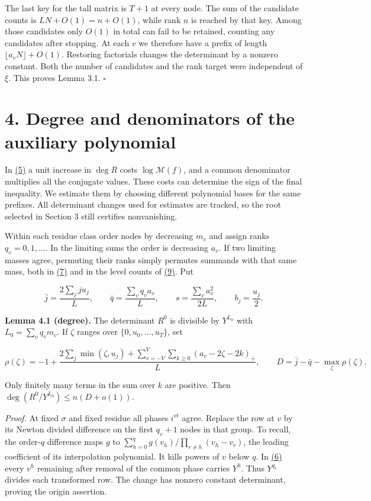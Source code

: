 \documentclass[11pt,a4paper]{article}
\begin{document}
The last key for the tall matrix is \(T+1\) at every node. The sum of the candidate counts is \(LN+O(1)=n+O(1)\), while rank \(n\) is reached by that key. Among those candidates only \(O(1)\) in total can fail to be retained, counting any candidates after stopping. At each \(v\) we therefore have a prefix of length \(\lfloor a_vN\rfloor+O(1)\). Restoring factorials changes the determinant by a nonzero constant. Both the number of candidates and the rank target were independent of \(\xi\). This proves Lemma 3.1. \(\square\)

\section{4. Degree and denominators of the auxiliary polynomial}\label{degree-and-denominators-of-the-auxiliary-polynomial}

In \hyperref[eq:5]{(5)} a unit increase in \(\deg R\) costs \(\log\mathcal M(f)\), and a common denominator multiplies all the conjugate values. These costs can determine the sign of the final inequality. We estimate them by choosing different polynomial bases for the same prefixes. All determinant changes used for estimates are tracked, so the root selected in Section 3 still certifies nonvanishing.

Within each residue class order nodes by decreasing \(m_v\) and assign ranks \(q_v=0,1,\ldots\). In the limiting sums the order is decreasing \(a_v\). If two limiting masses agree, permuting their ranks simply permutes summands with that same mass, both in \hyperref[eq:7]{(7)} and in the level counts of \hyperref[eq:9]{(9)}. Put

\[
 \bar j=\frac{2\sum_j ju_j}{L},\qquad \bar q=\frac{\sum_v q_va_v}{L},
 \qquad s=\frac{\sum_v a_v^2}{2L},\qquad b_j=\frac{u_j}{2}.                \tag{7}\label{eq:7}
\]

\textbf{Lemma 4.1 (degree).} The determinant \(R^0\) is divisible by \(Y^{L_0}\) with \(L_0=\sum_vq_vm_v\). If \(\zeta\) ranges over \(\{0,u_0,\ldots,u_T\}\), set

\[
 \rho(\zeta)=-1+\frac{2\sum_j\min(\zeta,u_j)+
                   \sum_{v=-V}^{V}\sum_{k\ge0}(a_v-2\zeta-2k)_+}{L},
 \qquad D=\bar j-\bar q-\max_\zeta\rho(\zeta).                             \tag{8}\label{eq:8}
\]

Only finitely many terms in the sum over \(k\) are positive. Then \(\deg(R^0/Y^{L_0})\le n(D+o(1))\).

\emph{Proof.} At fixed \(\sigma\) and fixed residue all phases \(i^{vt}\) agree. Replace the row at \(v\) by its Newton divided difference on the first \(q_v+1\) nodes in that group. To recall, the order-\(q\) difference maps \(g\) to \(\sum_{h=0}^q g(v_h)/\prod_{r\ne h}(v_h-v_r)\), the leading coefficient of its interpolation polynomial. It kills powers of \(v\) below \(q\). In \hyperref[eq:6]{(6)} every \(v^h\) remaining after removal of the common phase carries \(Y^h\). Thus \(Y^{q_v}\) divides each transformed row. The change has nonzero constant determinant, proving the origin assertion.
\end{document}
